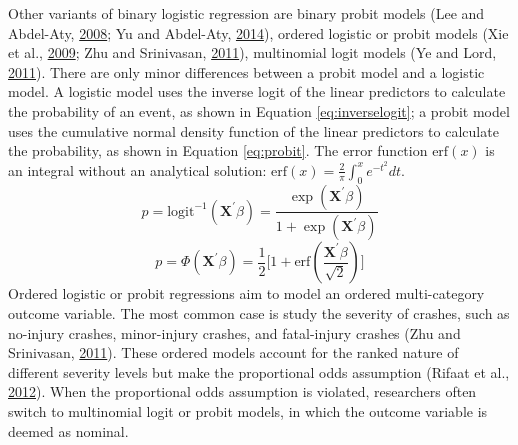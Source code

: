 \documentclass[12pt]{book}
\numberwithin{equation}{chapter}
\begin{document}
Other variants of binary logistic regression are binary probit models (Lee and Abdel-Aty, \protect\hyperlink{ref-lee2008presence}{2008}; Yu and Abdel-Aty, \protect\hyperlink{ref-yu2014using}{2014}), ordered logistic or probit models (Xie et al., \protect\hyperlink{ref-xie2009crash}{2009}; Zhu and Srinivasan, \protect\hyperlink{ref-zhu2011comprehensive}{2011}), multinomial logit models (Ye and Lord, \protect\hyperlink{ref-ye2011investigation}{2011}). There are only minor differences between a probit model and a logistic model. A logistic model uses the inverse logit of the linear predictors to calculate the probability of an event, as shown in Equation \eqref{eq:inverselogit}; a probit model uses the cumulative normal density function of the linear predictors to calculate the probability, as shown in Equation \eqref{eq:probit}. The error function \(\text{erf}(x)\) is an integral without an analytical solution: \(\text{erf}(x) = \frac{2}{\pi}\int_0^xe^{-t^2}dt\).
\begin{equation}
p = \text{logit}^{-1}(\mathbf{X}^\prime\beta) = \frac{\exp (\mathbf{X}^\prime\beta)}{1 + \exp (\mathbf{X}^\prime\beta)}
\label{eq:inverselogit}
\end{equation}
\begin{equation}
p = \Phi(\mathbf{X}^\prime\beta) = \frac{1}{2}\Big[1+\text{erf}(\frac{\mathbf{X}^\prime\beta}{\sqrt 2})\Big]
\label{eq:probit}
\end{equation}
Ordered logistic or probit regressions aim to model an ordered multi-category outcome variable. The most common case is study the severity of crashes, such as no-injury crashes, minor-injury crashes, and fatal-injury crashes (Zhu and Srinivasan, \protect\hyperlink{ref-zhu2011comprehensive}{2011}). These ordered models account for the ranked nature of different severity levels but make the proportional odds assumption (Rifaat et al., \protect\hyperlink{ref-rifaat2012severity}{2012}). When the proportional odds assumption is violated, researchers often switch to multinomial logit or probit models, in which the outcome variable is deemed as nominal.
\end{document}
